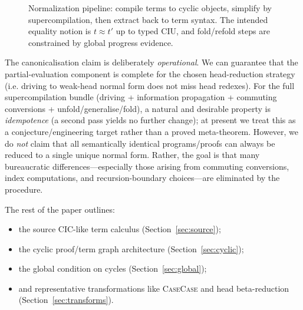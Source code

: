 \begin{figure}[t]
\centering
{}
\caption{Normalization pipeline: compile terms to cyclic objects, simplify by supercompilation, then extract back to term syntax. The intended equality notion is $t \approx t'$ up to typed CIU, and fold/refold steps are constrained by global progress evidence.}
\label{fig:pipeline}
\end{figure}
The canonicalisation claim is deliberately \emph{operational}.
We can guarantee that the partial-evaluation component is complete for the chosen head-reduction strategy (i.e. driving to weak-head normal form does not miss head redexes).
For the full supercompilation bundle (driving + information propagation + commuting conversions + unfold/generalise/fold), a natural and desirable property is \emph{idempotence} (a second pass yields no further change); at present we treat this as a conjecture/engineering target rather than a proved meta-theorem.
However, we do \emph{not} claim that all semantically identical programs/proofs can always be reduced to a single unique normal form.
Rather, the goal is that many bureaucratic differences---especially those arising from commuting conversions, index computations, and recursion-boundary choices---are eliminated by the procedure.

The rest of the paper outlines:
\begin{itemize}
\item the source CIC-like term calculus (Section~\ref{sec:source});
\item the cyclic proof/term graph architecture (Section~\ref{sec:cyclic});
\item the global condition on cycles (Section~\ref{sec:global});
\item and representative transformations like \textsc{CaseCase} and head beta-reduction (Section~\ref{sec:transforms}).
\end{itemize}

